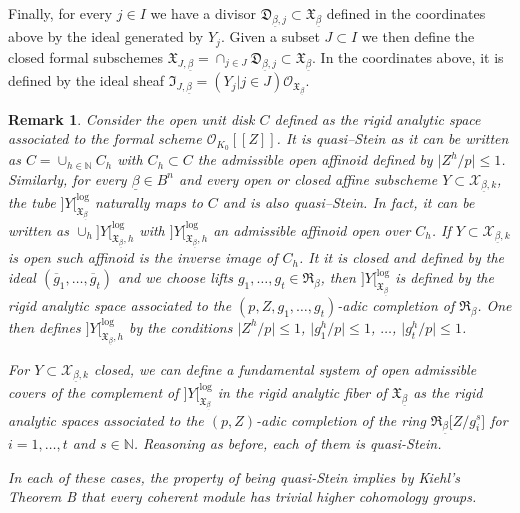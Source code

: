 \documentclass[asterisque,english]{smfart}
\newtheorem{remark}[theo]{Remark}
\begin{document}
Finally,  for every  $j\in I$  we have a divisor $\mathfrak{D}_{\underline{\beta},j} \subset \mathfrak{X}_{\underline{\beta}}$ defined in the coordinates above by the ideal generated by $Y_j$. Given a subset  $J\subset I$ we then define the closed formal subschemes $\mathfrak{X}_{J,\underline{\beta}}=\cap_{j\in J} \mathfrak{D}_{\underline{\beta},j} \subset \mathfrak{X}_{\underline{\beta}}$. In the coordinates above, it is defined by the ideal sheaf $\mathfrak{I}_{J,\underline{\beta}}=(Y_j\vert j\in J) \mathcal{O}_{\mathfrak{X}_{\underline{\beta}}}$.



\begin{remark}
\label{rmk:Stein} Consider the open unit disk $C$ defined as the rigid analytic space  associated to the formal scheme $\mathcal{O}_{K_0}\left[ \left[ Z\right] \right] $. It is quasi--Stein as it can be written as $C=\cup_{h\in \mathbb{N}} C_h$  with $C_h\subset C$ the admissible open affinoid defined by $\vert Z^h/p\vert\leq 1$.  Similarly, for every $\underline{\beta}\in B^n$ and every open or closed affine subscheme $Y \subset \mathcal{X}_{\underline{\beta},k}$, the tube $ \big]Y\big[_{\mathfrak{X}_{\underline{\beta}}}^{\log}  $ naturally maps to $C$ and is also quasi--Stein. In fact, it can be written as $\cup_h \big]Y\big[_{\mathfrak{X}_{\underline{\beta}},h}^{\log}  $ with $\big]Y\big[_{\mathfrak{X}_{\underline{\beta}},h}^{\log}  $ an admissible affinoid open over $C_h$. If $Y \subset \mathcal{X}_{\underline{\beta},k}$ is open such affinoid is the inverse image of $C_h$. It it is closed and defined by the ideal $(\overline{g}_1,\ldots,\overline{g}_t)$ and we choose lifts $g_1,\ldots,g_t\in \mathfrak{R}_\beta$, then $\big]Y\big[_{\mathfrak{X}_{\underline{\beta}}}^{\log}  $ is defined by the rigid analytic space associated to the $(p,Z,g_1,\ldots,g_t)$-adic completion of $\mathfrak{R}_\beta$. One then defines $\big]Y\big[_{\mathfrak{X}_{\underline{\beta}},h}^{\log}  $  by  the conditions $\vert Z^h/p\vert\leq 1$, $\vert g_1^h/p\vert\leq 1$, $\ldots$, $\vert g_t^h/p\vert\leq 1$. 

For $Y \subset \mathcal{X}_{\underline{\beta},k}$ closed,  we can define a   fundamental system of open admissible covers  of the complement of $ \big]Y\big[_{\mathfrak{X}_{\underline{\beta}}}^{\log}  $ in the rigid analytic fiber of $\mathfrak{X}_{\underline{\beta}}$ as the rigid analytic spaces associated to the $(p,Z)$-adic completion of the ring $\mathfrak{R}_{\underline{\beta}}\bigl[Z/g_i^s\bigr]$ for $i=1,\ldots,t$ and $s\in \mathbb{N}$. Reasoning as before, each of them is quasi-Stein.
 
In each of these cases, the property of being quasi-Stein implies by Kiehl's Theorem B that every coherent module has trivial  higher cohomology groups.


\end{remark}
\end{document}
